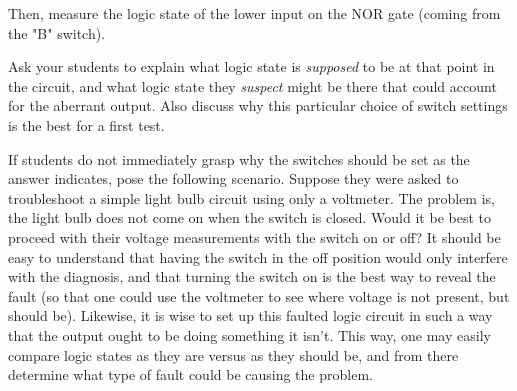 Then, measure the logic state of the lower input on the NOR gate (coming from the "B" switch).







Ask your students to explain what logic state is {\it supposed} to be at that point in the circuit, and what logic state they {\it suspect} might be there that could account for the aberrant output.  Also discuss why this particular choice of switch settings is the best for a first test.

If students do not immediately grasp why the switches should be set as the answer indicates, pose the following scenario.  Suppose they were asked to troubleshoot a simple light bulb circuit using only a voltmeter.  The problem is, the light bulb does not come on when the switch is closed.  Would it be best to proceed with their voltage measurements with the switch on or off?  It should be easy to understand that having the switch in the off position would only interfere with the diagnosis, and that turning the switch on is the best way to reveal the fault (so that one could use the voltmeter to see where voltage is not present, but should be).  Likewise, it is wise to set up this faulted logic circuit in such a way that the output ought to be doing something it isn't.  This way, one may easily compare logic states as they are versus as they should be, and from there determine what type of fault could be causing the problem.




